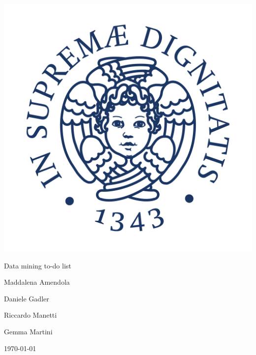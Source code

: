 \documentclass[a4paper]{article}
\begin{document}
\begin{landscape}
\begin{titlepage}
\begin{center}
\vspace{3cm}

\huge

\vspace{2cm}

\includegraphics[scale=0.2]{Cherubino.jpg}

\vspace{1.5cm}

{\Huge \sc Data mining to-do list}

\vspace{0.5cm}

Maddalena Amendola

\vspace{0.5cm}

Daniele Gadler

\vspace{0.5cm}

Riccardo Manetti

\vspace{0.5cm}

Gemma Martini

\vfill

\today

\end{center}
\end{titlepage}


\end{landscape}
\end{document}
